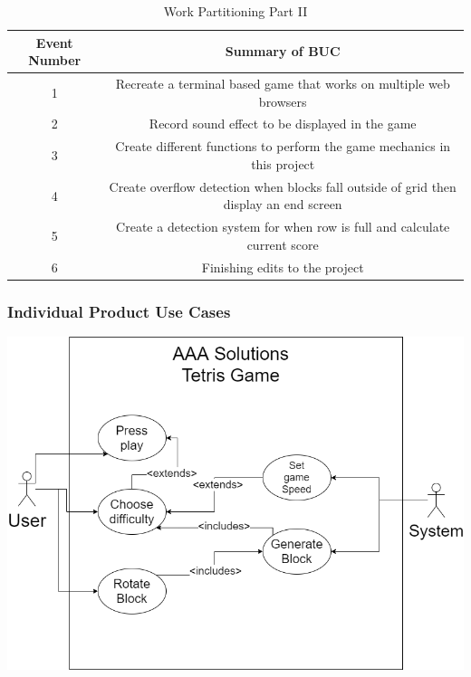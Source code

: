 \documentclass[12pt, titlepage]{article}
\begin{document}
\begin{table}[H]
\caption{Work Partitioning Part II}
\hskip-2.5cm\begin{tabular}{|c|c|}

\hline
Event Number & Summary of BUC\\
\hline
1 & Recreate a terminal based game that works on multiple web browsers\\ 
\hline
2 & Record sound effect to be displayed in the game\\
\hline
3 & Create different functions to perform the game mechanics in this project\\
\hline
4 & Create overflow detection when blocks fall outside of grid then display an end screen\\
\hline
5 & Create a detection system for when row is full and calculate current score\\
\hline
6 & Finishing edits to the project\\
\hline

\end{tabular}
\label{default}
\end{table}%


    
    
\subsubsection{Individual Product Use Cases}

\includegraphics[width=0.95\linewidth]{usecasexa3.png}
\end{document}
